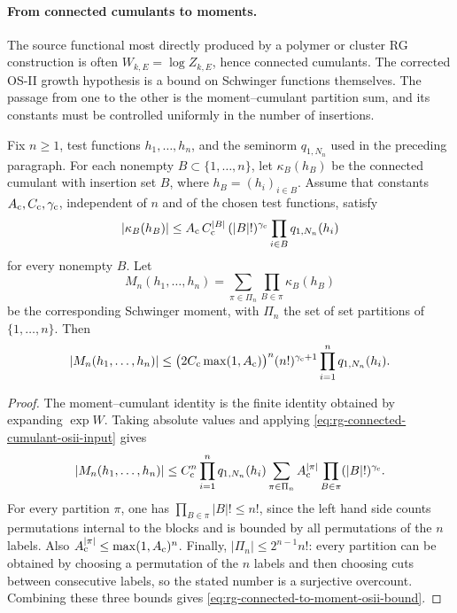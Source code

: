 \paragraph{From connected cumulants to moments.}
The source functional most directly produced by a polymer or cluster RG
construction is often \(W_{k,E}=\log Z_{k,E}\), hence connected cumulants.
The corrected OS-II growth hypothesis is a bound on Schwinger functions
themselves.  The passage from one to the other is the moment--cumulant
partition sum, and its constants must be controlled uniformly in the number
of insertions.

\begin{lemma}
\label{lem:rg-cumulant-partition-osii-bound}
Fix \(n\geq1\), test functions \(h_1,\ldots,h_n\), and the seminorm
\(q_{1,N_n}\) used in the preceding paragraph.  For each nonempty
\(B\subset\{1,\ldots,n\}\), let
\(\kappa_B(h_B)\) be the connected cumulant with insertion set \(B\), where
\(h_B=(h_i)_{i\in B}\).  Assume that constants
\(A_{\rm c},C_{\rm c},\gamma_{\rm c}\), independent of \(n\) and of the
chosen test functions, satisfy
\begin{equation}
  |\kappa_B(h_B)|
  \leq
  A_{\rm c}\,C_{\rm c}^{|B|}\,(|B|!)^{\gamma_{\rm c}}
  \prod_{i\in B}q_{1,N_n}(h_i)
  \label{eq:rg-connected-cumulant-osii-input}
\end{equation}
for every nonempty \(B\).  Let
\[
  M_n(h_1,\ldots,h_n)
  =
  \sum_{\pi\in\Pi_n}\prod_{B\in\pi}\kappa_B(h_B)
\]
be the corresponding Schwinger moment, with \(\Pi_n\) the set of set
partitions of \(\{1,\ldots,n\}\).  Then
\begin{equation}
  |M_n(h_1,\ldots,h_n)|
  \leq
  \bigl(2C_{\rm c}\max(1,A_{\rm c})\bigr)^n
  (n!)^{\gamma_{\rm c}+1}
  \prod_{i=1}^n q_{1,N_n}(h_i).
  \label{eq:rg-connected-to-moment-osii-bound}
\end{equation}
\end{lemma}

\begin{proof}
The moment--cumulant identity is the finite identity obtained by expanding
\(\exp W\).  Taking absolute values and applying
\eqref{eq:rg-connected-cumulant-osii-input} gives
\[
  |M_n(h_1,\ldots,h_n)|
  \leq
  C_{\rm c}^{n}
  \prod_{i=1}^n q_{1,N_n}(h_i)
  \sum_{\pi\in\Pi_n}
  A_{\rm c}^{|\pi|}
  \prod_{B\in\pi}(|B|!)^{\gamma_{\rm c}} .
\]
For every partition \(\pi\), one has
\(\prod_{B\in\pi}|B|!\leq n!\), since the left hand side counts
permutations internal to the blocks and is bounded by all permutations of
the \(n\) labels.  Also
\(A_{\rm c}^{|\pi|}\leq \max(1,A_{\rm c})^n\).  Finally,
\(|\Pi_n|\leq 2^{n-1}n!\): every partition can be obtained by choosing a
permutation of the \(n\) labels and then choosing cuts between consecutive
labels, so the stated number is a surjective overcount.  Combining these
three bounds gives \eqref{eq:rg-connected-to-moment-osii-bound}.
\end{proof}


